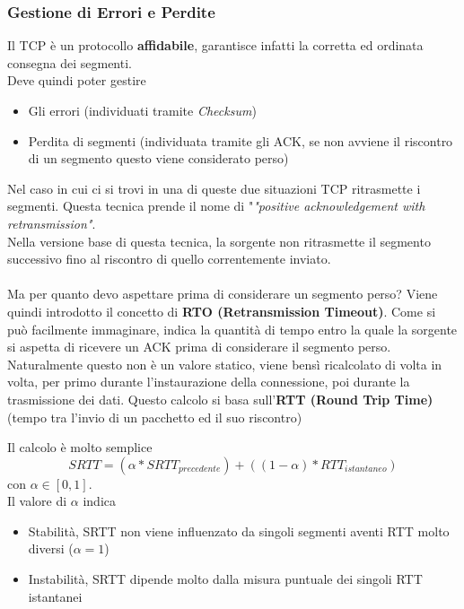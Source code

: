 \documentclass{article}
\newcounter{subsubsubsection}[subsubsection]
\begin{document}
            \subsubsection{Gestione di Errori e Perdite}
                Il TCP è un protocollo \textbf{affidabile}, garantisce infatti la corretta ed ordinata consegna dei segmenti.\\
                Deve quindi poter gestire
                \begin{itemize}
                    \item Gli errori (individuati tramite \textit{Checksum})
                    \item Perdita di segmenti (individuata tramite gli ACK, se non avviene il riscontro di un segmento questo viene considerato perso)
                \end{itemize}
                Nel caso in cui ci si trovi in una di queste due situazioni TCP ritrasmette i segmenti. Questa tecnica prende il nome di "\textit{"positive acknowledgement with retransmission"}.\\
                Nella versione base di questa tecnica, la sorgente non ritrasmette il segmento successivo fino al riscontro di quello correntemente inviato.\\
                \\
                Ma per quanto devo aspettare prima di considerare un segmento perso? Viene quindi introdotto il concetto di \textbf{RTO (Retransmission Timeout)}. Come si può facilmente immaginare, indica la quantità di tempo entro la quale la sorgente si aspetta di ricevere un ACK prima di considerare il segmento perso.\\
                Naturalmente questo non è un valore statico, viene bensì ricalcolato di volta in volta, per primo durante l'instaurazione della connessione, poi durante la trasmissione dei dati. Questo calcolo si basa sull'\textbf{RTT (Round Trip Time)} (tempo tra l'invio di un pacchetto ed il suo riscontro) 

                    Il calcolo è molto semplice
                    \[
                        SRTT = (\alpha*SRTT_{precedente})+((1-\alpha)*RTT_{istantaneo})    
                    \]
                    con $ \alpha \in [0,1] $.\\
                    Il valore di $ \alpha $ indica
                    \begin{itemize}
                        \item Stabilità, SRTT non viene influenzato da singoli segmenti aventi RTT molto diversi ($ \alpha = 1 $)
                        \item Instabilità, SRTT dipende molto dalla misura puntuale dei singoli RTT istantanei
                    \end{itemize}
\end{document}
